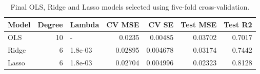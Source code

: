\begin{table}[htbp]
    \centering
    \caption{Final OLS, Ridge and Lasso models selected using five-fold cross-validation.}
    \label{tab:final-models}
\begin{tabular}{lrlrrrr}
\hline\hline
Model & Degree & Lambda & CV MSE & CV SE & Test MSE & Test R2 \\
\hline
OLS & 10 & - & 0.0235 & 0.00485 & 0.03702 & 0.7017 \\
Ridge & 6 & 1.8e-03 & 0.02895 & 0.004678 & 0.03174 & 0.7442 \\
Lasso & 6 & 1.8e-03 & 0.02704 & 0.004996 & 0.02323 & 0.8128 \\
\hline\hline
\end{tabular}
\end{table}
